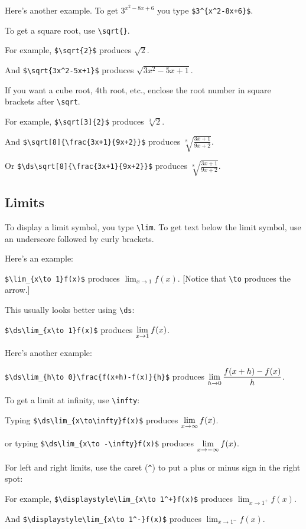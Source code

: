 \documentclass[12pt]{article}
\begin{document}
Here's another example. To get $3^{x^2-8x+6}$ you type \verb|$3^{x^2-8x+6}$|.

To get a square root, use \verb|\sqrt{}|.

For example, \verb|$\sqrt{2}$| produces $\sqrt{2}$.

And \verb|$\sqrt{3x^2-5x+1}$| produces $\sqrt{3x^2-5x+1}$.

If you want a cube root, 4th root, etc., enclose the root number in square brackets after \verb|\sqrt|.

For example, \verb|$\sqrt[3]{2}$| produces $\sqrt[3]{2}$.

And \verb|$\sqrt[8]{\frac{3x+1}{9x+2}}$| produces $\sqrt[8]{\frac{3x+1}{9x+2}}$.

Or \verb|$\ds\sqrt[8]{\frac{3x+1}{9x+2}}$| produces $\displaystyle\sqrt[8]{\frac{3x+1}{9x+2}}$.

\subsection{Limits}

To display a limit symbol, you type \verb|\lim|. To get text below the limit symbol, use an underscore followed by curly brackets.

Here's an example:

\verb|$\lim_{x\to 1}f(x)$| produces $\lim_{x\to 1}f(x)$. [Notice that \verb|\to| produces the arrow.]

This usually looks better using \verb|\ds|:

\verb|$\ds\lim_{x\to 1}f(x)$| produces $\displaystyle\lim_{x\to 1}f(x)$.

Here's another example:

\verb|$\ds\lim_{h\to 0}\frac{f(x+h)-f(x)}{h}$| produces $\displaystyle\lim_{h\to 0}\frac{f(x+h)-f(x)}{h}$.

To get a limit at infinity, use \verb|\infty|:

Typing \verb|$\ds\lim_{x\to\infty}f(x)$| produces $\displaystyle\lim_{x\to\infty}f(x)$.

or typing \verb|$\ds\lim_{x\to -\infty}f(x)$| produces $\displaystyle\lim_{x\to -\infty}f(x)$.

For left and right limits, use the caret (\verb|^|) to put a plus or minus sign in the right spot:

For example, \verb|$\displaystyle\lim_{x\to 1^+}f(x)$| produces $\displaystyle\lim_{x\to 1^+}f(x)$.

And \verb|$\displaystyle\lim_{x\to 1^-}f(x)$| produces $\displaystyle\lim_{x\to 1^-}f(x)$.
\end{document}
